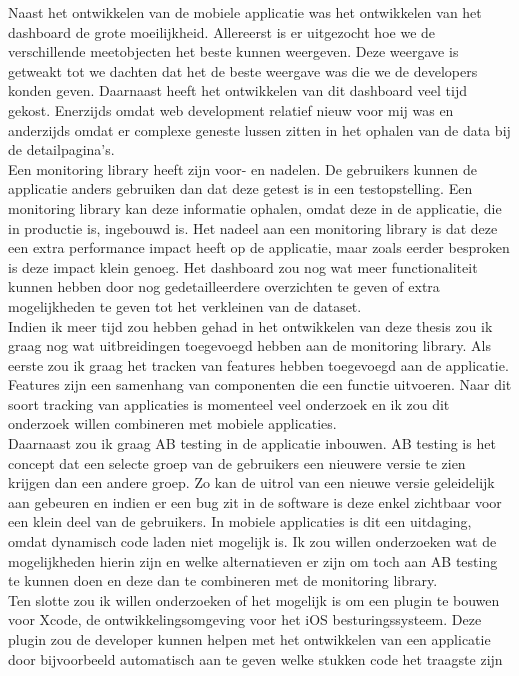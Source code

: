 Naast het ontwikkelen van de mobiele applicatie was het ontwikkelen van het dashboard de grote moeilijkheid. Allereerst is er uitgezocht hoe we de verschillende meetobjecten het beste kunnen weergeven. Deze weergave is getweakt tot we dachten dat het de beste weergave was die we de developers konden geven. Daarnaast heeft het ontwikkelen van dit dashboard veel tijd gekost. Enerzijds omdat web development relatief nieuw voor mij was en anderzijds omdat er complexe geneste lussen zitten in het ophalen van de data bij de detailpagina's. \\

Een monitoring library heeft zijn voor- en nadelen. De gebruikers kunnen de applicatie anders gebruiken dan dat deze getest is in een testopstelling. Een monitoring library kan deze informatie ophalen, omdat deze in de applicatie, die in productie is, ingebouwd is. Het nadeel aan een monitoring library is dat deze een extra performance impact heeft op de applicatie, maar zoals eerder besproken is deze impact klein genoeg. Het dashboard zou nog wat meer functionaliteit kunnen hebben door nog gedetailleerdere overzichten te geven of extra mogelijkheden te geven tot het verkleinen van de dataset. \\

Indien ik meer tijd zou hebben gehad in het ontwikkelen van deze thesis zou ik graag nog wat uitbreidingen toegevoegd hebben aan de monitoring library. Als eerste zou ik graag het tracken van features hebben toegevoegd aan de applicatie. Features zijn een samenhang van componenten die een functie uitvoeren. Naar dit soort tracking van applicaties is momenteel veel onderzoek en ik zou dit onderzoek willen combineren met mobiele applicaties. \\
Daarnaast zou ik graag AB testing in de applicatie inbouwen. AB testing is het concept dat een selecte groep van de gebruikers een nieuwere versie te zien krijgen dan een andere groep. Zo kan de uitrol van een nieuwe versie geleidelijk aan gebeuren en indien er een bug zit in de software is deze enkel zichtbaar voor een klein deel van de gebruikers. In mobiele applicaties is dit een uitdaging, omdat dynamisch code laden niet mogelijk is. Ik zou willen onderzoeken wat de mogelijkheden hierin zijn en welke alternatieven er zijn om toch aan AB testing te kunnen doen en deze dan te combineren met de monitoring library.\\
Ten slotte zou ik willen onderzoeken of het mogelijk is om een plugin te bouwen voor Xcode, de ontwikkelingsomgeving voor het iOS besturingssysteem. Deze plugin zou de developer kunnen helpen met het ontwikkelen van een applicatie door bijvoorbeeld automatisch aan te geven welke stukken code het traagste zijn%
 
